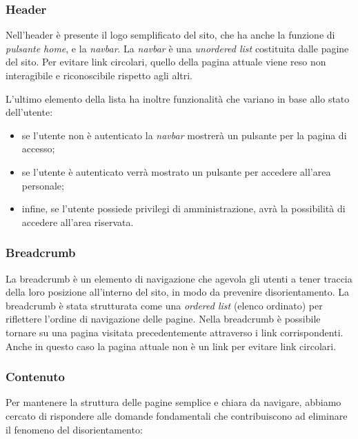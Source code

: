 \subsubsection{Header}
Nell'header è presente il logo semplificato del sito, che ha anche la funzione di \textit{pulsante home}, e la \textit{navbar}. La \textit{navbar} è una \textit{unordered list} costituita dalle pagine del sito. Per evitare link circolari, quello della pagina attuale viene reso non interagibile e riconoscibile rispetto agli altri.

L'ultimo elemento della lista ha inoltre funzionalità che variano in base allo stato\\ dell'utente:
\begin{itemize}
    \item se l'utente non è autenticato la \textit{navbar} mostrerà un pulsante per la pagina di accesso;
    \item se l'utente è autenticato verrà mostrato un pulsante per accedere all'area personale;
    \item infine, se l'utente possiede privilegi di amministrazione, avrà la possibilità di accedere all'area riservata.
\end{itemize}

\subsubsection{Breadcrumb}
La breadcrumb è un elemento di navigazione che agevola gli utenti a tener traccia della loro posizione all'interno del sito, in modo da prevenire disorientamento. La breadcrumb è stata strutturata come una \textit{ordered list} (elenco ordinato) per riflettere l'ordine di navigazione delle pagine.
Nella breadcrumb è possibile tornare su una pagina visitata precedentemente attraverso i link corrispondenti. Anche in questo caso la pagina attuale non è un link per evitare link circolari.

\subsubsection{Contenuto}
Per mantenere la struttura delle pagine semplice e chiara da navigare, abbiamo cercato di rispondere alle domande fondamentali che contribuiscono ad eliminare il fenomeno del disorientamento:

